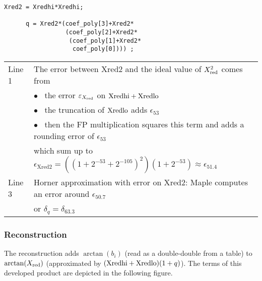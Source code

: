 \begin{lstlisting}[caption={Polynomial Evaluation},firstnumber=1]
      Xred2 = Xredhi*Xredhi;
      
      q = Xred2*(coef_poly[3]+Xred2*
                 (coef_poly[2]+Xred2*
                  (coef_poly[1]+Xred2*
                   coef_poly[0]))) ;

\end{lstlisting}
\begin{tabular}{ll}
Line 1 & The error between $\mathrm{Xred2}$ and the ideal value of $X_{\mathrm{red}}^2$ comes from\\
       & $\bullet$~ the error $\varepsilon_{X_{\mathrm{red}}}$  on ${\mathrm{Xredhi}}+{\mathrm{Xredlo}}$\\
       & $\bullet$~ the truncation of ${\mathrm{Xredlo}}$ adds $\epsilon_{53}$\\
       & $\bullet$~ then the FP multiplication squares this term and adds a rounding error of $\epsilon_{53}$\\
       & which sum up to  $\epsilon_\mathrm{Xred2} = ((1+2^{-53}+2^{-105})^2)(1+2^{-53}) 
          \approx \epsilon_{51.4}$ \\
Line 3 & Horner approximation with error on $\mathrm{Xred2}$:
      Maple computes an error around $\epsilon_{50.7}$\\
      & or $\delta_{q}=\delta_{63.3}$\\ 
\end{tabular}

\subsubsection{Reconstruction}

The reconstruction adds $\arctan(b_i)$ (read as a double-double
from a table) to $\arctan(X_{\mathrm{red}})$ (approximated by
$({\mathrm{Xredhi}}+{\mathrm{Xredlo}})(1+q)$).  The terms of this developed product are
depicted in the following figure.


\begin{center}
 \small
 \setlength{\unitlength}{3ex}
  \end{center}
  
